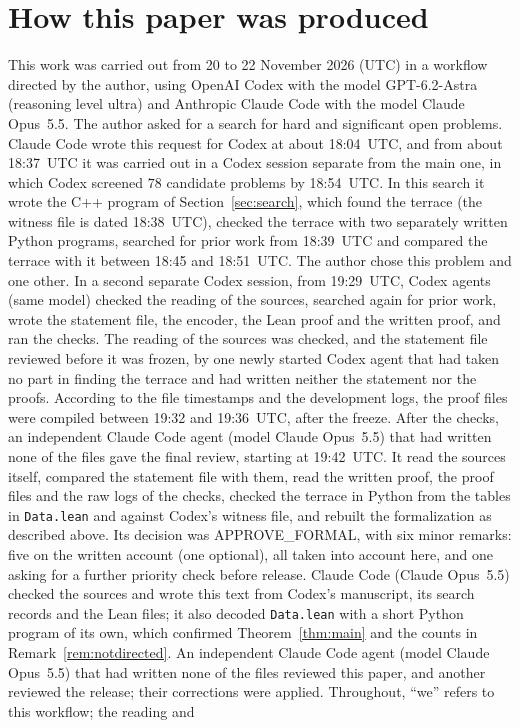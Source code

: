 \documentclass[11pt]{article}
\theoremstyle{definition}
\theoremstyle{remark}
\begin{document}
\section*{How this paper was produced}
This work was carried out from 20 to 22 November 2026 (UTC) in a workflow directed by
the author, using OpenAI Codex with the model GPT-6.2-Astra (reasoning level
ultra) and Anthropic Claude Code with the model Claude Opus~5.5. The author asked for a search for hard and significant open problems.
Claude Code wrote this request for Codex at about 18:04~UTC, and from about
18:37~UTC it was carried out in a Codex session separate from the main one,
in which Codex screened $78$ candidate problems by 18:54~UTC. In this
search it wrote the C++ program of Section~\ref{sec:search}, which found the
terrace (the witness file is dated 18:38~UTC), checked the terrace with two separately written Python programs, searched for
prior work from 18:39~UTC and compared the terrace with it between 18:45 and
18:51~UTC. The author chose this problem and one other. In a second
separate Codex session, from 19:29~UTC, Codex agents (same model) checked the
reading of the sources, searched again for prior work, wrote the statement
file, the encoder, the Lean proof and the written proof, and ran the checks.
The reading of the sources was checked, and the statement file reviewed before
it was frozen, by one newly started Codex agent that had taken no part in
finding the terrace and had written neither the statement nor the proofs.
According to the file timestamps and the development logs, the proof files
were compiled between 19:32 and 19:36~UTC, after the freeze. After the checks,
an independent Claude Code agent (model Claude Opus~5.5) that had written none
of the files gave the final review, starting at 19:42~UTC. It read the sources
itself, compared the statement file with them, read the written proof, the
proof files and the raw logs of the checks, checked the terrace in Python from
the tables in \texttt{Data.lean} and against Codex's witness file, and rebuilt
the formalization as described above. Its decision was APPROVE\_FORMAL, with
six minor remarks: five on the written account (one optional), all taken into
account here, and one asking for a further priority check before release.
Claude Code (Claude Opus~5.5) checked the sources and wrote this text from
Codex's manuscript, its search records and the Lean files; it also decoded
\texttt{Data.lean} with a short Python program of its own, which confirmed
Theorem~\ref{thm:main} and the counts in Remark~\ref{rem:notdirected}.
An independent Claude Code agent (model Claude Opus~5.5) that had written none of the files reviewed this paper, and another reviewed the release; their corrections were applied. Throughout, ``we'' refers to this workflow; the reading and
\end{document}
